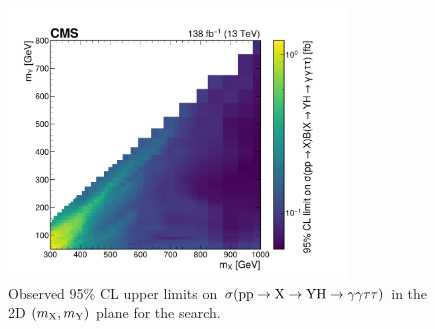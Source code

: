 \begin{figure}
    \centering
    \includegraphics[width=0.8\textwidth]{Figures/Dihiggs/results/limits/limits_2d_obs_y_tautau_paper.pdf}
    \caption[\XYttHgg Upper Limits in the 2D $(\mX,\mY)$ Plane]{Observed 95\% CL upper limits on $\sigma(\mathrm{p}\mathrm{p} \to \mathrm{X} \to \mathrm{Y}\mathrm{H} \to \gamma\gamma\tau\tau)$ in the 2D $(\mX,\mY)$ plane for the \XYttHgg search.}\label{fig:limits_2d_obs_y_tautau}
\end{figure}


